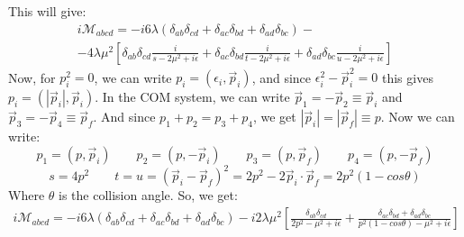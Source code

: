 \documentclass{article}
\begin{document}
\begin{center}
\hspace{1cm}
\end{center}
This will give:
\begin{equation}
\begin{gathered}
    i\mathcal{M}_{abcd} = -i6\lambda\left(\delta_{ab}\delta_{cd} + \delta_{ac}\delta_{bd} + \delta_{ad}\delta_{bc}\right) - \\ - 4\lambda\mu^2 \left[\delta_{ab}\delta_{cd}\frac{i}{s - 2\mu^2 + i\epsilon} + \delta_{ac}\delta_{bd}\frac{i}{t - 2\mu^2 + i\epsilon} + \delta_{ad}\delta_{bc}\frac{i}{u - 2\mu^2 + i\epsilon}\right]
\end{gathered}
\end{equation}
Now, for $p_i^2 = 0$, we can write $p_i = (\epsilon_i, \vec{p}_i)$, and since $\epsilon_i^2 - \vec{p}_i^2 = 0$ this gives $p_i = (|\vec{p}_i|, \vec{p}_i)$. In the COM system, we can write $\vec{p}_1 = -\vec{p}_2 \equiv \vec{p}_i$ and $\vec{p}_3 = -\vec{p}_4 \equiv \vec{p}_f$. And since $p_1 + p_2 = p_3 + p_4$, we get $\left|\vec{p}_i\right| = \left|\vec{p}_f\right| \equiv p$. Now we can write:
\begin{equation}
    p_1 = (p, \vec{p}_i)
    \qquad
    p_2 = (p, -\vec{p}_i)
    \qquad
    p_3 = (p, \vec{p}_f)
    \qquad
    p_4 = (p, -\vec{p}_f)
\end{equation}
\begin{equation}
    s = 4p^2 \qquad t = u = (\vec{p}_i - \vec{p}_f)^2 = 2p^2 - 2\vec{p}_i\cdot\vec{p}_f = 2p^2 \left(1 - cos\theta\right)
\end{equation}
Where $\theta$ is the collision angle. So, we get:
\begin{equation}
\begin{gathered}
    i\mathcal{M}_{abcd} = -i6\lambda\left(\delta_{ab}\delta_{cd} + \delta_{ac}\delta_{bd} + \delta_{ad}\delta_{bc}\right) - i2\lambda\mu^2 \left[\frac{\delta_{ab}\delta_{cd}}{2p^2 - \mu^2 + i\epsilon} + \frac{\delta_{ac}\delta_{bd} + \delta_{ad}\delta_{bc}}{p^2 \left(1 - cos\theta\right) - \mu^2 + i\epsilon}\right]
\end{gathered}
\end{equation}
\end{document}
